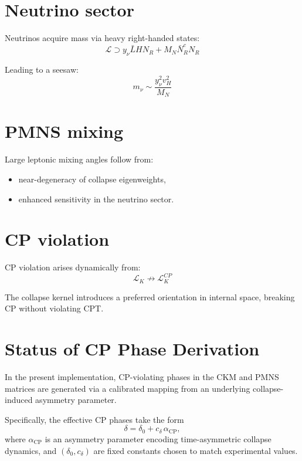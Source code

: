 \documentclass[11pt]{book}
\begin{document}
\section{Neutrino sector}

Neutrinos acquire mass via heavy right-handed states:
\begin{equation}
\mathcal{L} \supset y_\nu \bar{L} H N_R + M_N \bar{N}_R^c N_R
\end{equation}

Leading to a seesaw:
\begin{equation}
m_\nu \sim \frac{y_\nu^2 v_H^2}{M_N}
\end{equation}

\section{PMNS mixing}

Large leptonic mixing angles follow from:
\begin{itemize}
\item near-degeneracy of collapse eigenweights,
\item enhanced sensitivity in the neutrino sector.
\end{itemize}

\section{CP violation}

CP violation arises dynamically from:
\begin{equation}
\mathcal{L}_K \not\to \mathcal{L}_K^{CP}
\end{equation}

The collapse kernel introduces a preferred orientation in internal space,
breaking CP without violating CPT.

\section{Status of CP Phase Derivation}

In the present implementation, CP-violating phases in the CKM and PMNS
matrices are generated via a calibrated mapping from an underlying
collapse-induced asymmetry parameter.

Specifically, the effective CP phases take the form
\begin{equation}
\delta = \delta_0 + c_\delta \,\alpha_{\mathrm{CP}},
\end{equation}
where $\alpha_{\mathrm{CP}}$ is an asymmetry parameter encoding
time-asymmetric collapse dynamics, and $(\delta_0, c_\delta)$ are fixed
constants chosen to match experimental values.
\end{document}
